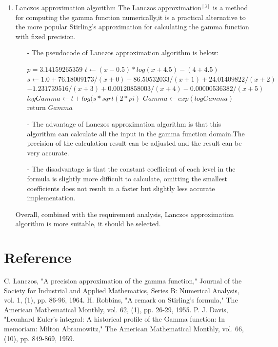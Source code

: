 \documentclass[12pt]{extarticle}
\newcommand{\<}{\langle}
\renewcommand{\>}{\rangle}
\theoremstyle{definition}
\begin{document}
\begin{enumerate}[\text{3.}1]
\begin{enumerate}
\end{enumerate}
\item Lanczos approximation algorithm
\newline
The Lanczos approximation$^{[3]}$ is a method for computing the gamma function numerically,it is a practical alternative to the more popular Stirling's approximation for calculating the gamma function with fixed precision.
\begin{enumerate}

\item[-]The pseudocode of Lanczos approximation algorithm is below: 

\begin{codebox}
\li $p=3.14159265359$
\li $t \gets (x-0.5)*log(x+4.5)-(4+4.5)$
\li $s \gets 1.0 + 76.18009173 / (x + 0) - 86.50532033 / (x + 1) + 24.01409822 / (x + 2)$ \\
$- 1.231739516 / (x + 3) + 0.00120858003 / (x + 4) - 0.00000536382 / (x + 5)$
\li $logGamma \gets t+log(s*sqrt(2*pi)$
\li $Gamma \gets exp(logGamma)$
\li return $Gamma$
\end{codebox}
\item[-]The advantage of Lanczos approximation algorithm is that this algorithm can calculate all the input in the gamma function domain.The precision of the calculation result can be adjusted and the result can be very accurate.
\item[-]The disadvantage is that the constant coefficient of each level in the formula is slightly more difficult to calculate, omitting the smallest coefficients does not result in a faster but slightly less accurate implementation.
\end{enumerate}
Overall, combined with the requirement analysis, Lanczos approximation algorithm is more suitable, it should be selected.
\end{enumerate}
\section{Reference}

\noindent[1] C. Lanczos, "A precision approximation of the gamma function," Journal of the Society for Industrial and Applied Mathematics, Series B: Numerical Analysis, vol. 1, (1), pp. 86-96, 1964.
\newline
[2] H. Robbins, "A remark on Stirling's formula," The American Mathematical Monthly, vol. 62, (1), pp. 26-29, 1955.
\newline
[3] P. J. Davis, "Leonhard Euler's integral: A historical profile of the Gamma function: In memoriam: Milton Abramowitz," The American Mathematical Monthly, vol. 66, (10), pp. 849-869, 1959. 
\end{document}
